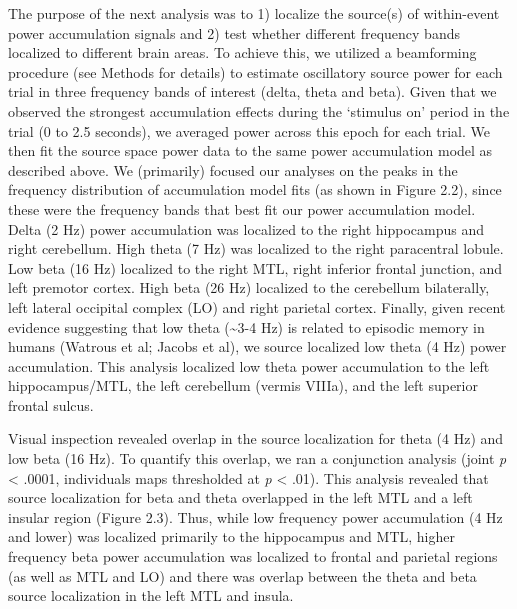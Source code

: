 The purpose of the next analysis was to 1) localize the source(s) of
within-event power accumulation signals and 2) test whether different
frequency bands localized to different brain areas. To achieve this, we
utilized a beamforming procedure (see Methods for details) to estimate
oscillatory source power for each trial in three frequency bands of
interest (delta, theta and beta). Given that we observed the strongest
accumulation effects during the `stimulus on' period in the trial (0 to
2.5 seconds), we averaged power across this epoch for each trial. We
then fit the source space power data to the same power accumulation
model as described above. We (primarily) focused our analyses on the
peaks in the frequency distribution of accumulation model fits (as shown
in Figure 2.2), since these were the frequency bands that best fit our
power accumulation model. Delta (2 Hz) power accumulation was localized
to the right hippocampus and right cerebellum. High theta (7 Hz) was
localized to the right paracentral lobule. Low beta (16 Hz) localized to
the right MTL, right inferior frontal junction, and left premotor
cortex. High beta (26 Hz) localized to the cerebellum bilaterally, left
lateral occipital complex (LO) and right parietal cortex. Finally, given
recent evidence suggesting that low theta (\textasciitilde{}3-4 Hz) is
related to episodic memory in humans (Watrous et al; Jacobs et al), we
source localized low theta (4 Hz) power accumulation. This analysis
localized low theta power accumulation to the left hippocampus/MTL, the
left cerebellum (vermis VIIIa), and the left superior frontal sulcus.

Visual inspection revealed overlap in the source localization for theta
(4 Hz) and low beta (16 Hz). To quantify this overlap, we ran a
conjunction analysis (joint \emph{p} \textless{} .0001, individuals maps
thresholded at \emph{p} \textless{} .01). This analysis revealed that
source localization for beta and theta overlapped in the left MTL and a
left insular region (Figure 2.3). Thus, while low frequency power
accumulation (4 Hz and lower) was localized primarily to the hippocampus
and MTL, higher frequency beta power accumulation was localized to
frontal and parietal regions (as well as MTL and LO) and there was
overlap between the theta and beta source localization in the left MTL
and insula.

